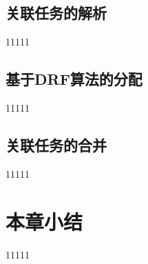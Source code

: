 \subsection{关联任务的解析}
11111

\subsection{基于DRF算法的分配}
11111

\subsection{关联任务的合并}
11111

\section{本章小结}
11111